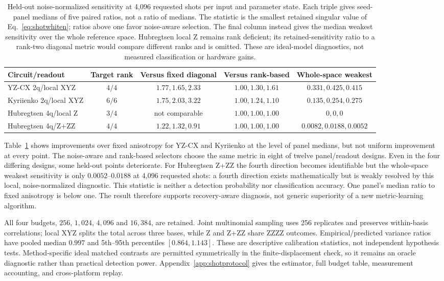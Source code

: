 \begin{table}[tp]
\caption{Held-out noise-normalized sensitivity at 4,096 requested
shots per input and parameter state. Each triple gives seed-panel
medians of five paired ratios, not a ratio of medians.
The statistic is the smallest retained singular value of
Eq.~\eqref{eq:shotwhiten}; ratios above one favor noise-aware selection.
The final column instead gives the median weakest sensitivity over
the whole reference space. Hubregtsen local Z remains rank deficient;
its retained-sensitivity ratio to a rank-two diagonal metric would
compare different ranks and is omitted. These are ideal-model
diagnostics, not measured classification or hardware gains.}
\label{tab:shotdesign}
\small
\begin{tabular}{@{}lcccc@{}}
\toprule
Circuit/readout & Target rank & Versus fixed diagonal & Versus rank-based & Whole-space weakest\\
\midrule
YZ-CX 2q/local XYZ & $4/4$ & $1.77,1.65,2.33$ & $1.00,1.30,1.61$ & $0.331,0.425,0.415$\\
Kyriienko 2q/local XYZ & $6/6$ & $1.75,2.03,3.22$ & $1.00,1.24,1.10$ & $0.135,0.254,0.275$\\
Hubregtsen 4q/local Z & $3/4$ & not comparable & $1.00,1.00,1.00$ & $0,0,0$\\
Hubregtsen 4q/Z+ZZ & $4/4$ & $1.22,1.32,0.91$ & $1.00,1.00,1.00$ & $0.0082,0.0188,0.0052$\\
\bottomrule
\end{tabular}
\end{table}

Table~\ref{tab:shotdesign} shows improvements over fixed anisotropy
for YZ-CX and Kyriienko at the level of panel medians, but not uniform
improvement at every point. The noise-aware and rank-based selectors
choose the same metric in eight of twelve panel/readout designs.
Even in the four differing designs, some held-out points deteriorate.
For Hubregtsen Z+ZZ the fourth direction becomes identifiable but
the whole-space weakest sensitivity is only $0.0052$--$0.0188$ at
4,096 requested shots: a fourth direction exists mathematically but
is weakly resolved by this local, noise-normalized diagnostic.
This statistic is neither a detection probability nor classification
accuracy. One panel's
median ratio to fixed anisotropy is below one. The result therefore
supports recovery-aware diagnosis, not generic superiority of a new
metric-learning algorithm.

All four budgets, $256$, $1{,}024$, $4{,}096$ and $16{,}384$, are
retained. Joint multinomial sampling uses 256 replicates and preserves
within-basis correlations; local XYZ splits the total across three
bases, while Z and Z+ZZ share ZZZZ outcomes. Empirical/predicted
variance ratios have pooled median $0.997$ and 5th--95th percentiles
$[0.864,1.143]$. These are descriptive calibration statistics, not
independent hypothesis tests. Method-specific ideal matched contrasts
are permitted symmetrically in the finite-displacement check, so it
remains an oracle diagnostic rather than practical detection power.
Appendix~\ref{app:shotprotocol} gives the estimator, full budget table,
measurement accounting, and cross-platform replay.


